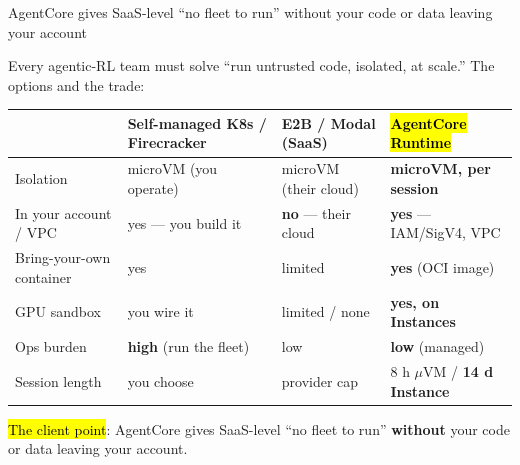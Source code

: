 \begin{frame}{AgentCore gives SaaS-level ``no fleet to run'' without your code or data leaving your account}
{\footnotesize Every agentic-RL team must solve ``run untrusted code, isolated, at scale.'' The options and the trade:\par}
\vspace{2mm}
\footnotesize
\begin{tabularx}{\textwidth}{@{}l Y Y Y@{}}
\toprule
 & \textbf{Self-managed K8s / Firecracker} & \textbf{E2B / Modal (SaaS)} & \hl{AgentCore Runtime}\\
\midrule
Isolation & microVM (you operate) & microVM (their cloud) & \textbf{microVM, per session}\\
In your account / VPC & yes --- you build it & \textbf{no} --- their cloud & \textbf{yes} --- IAM/SigV4, VPC\\
Bring-your-own container & yes & limited & \textbf{yes} (OCI image)\\
GPU sandbox & you wire it & limited / none & \textbf{yes, on Instances}\\
Ops burden & \textbf{high} (run the fleet) & low & \textbf{low} (managed)\\
Session length & you choose & provider cap & 8 h $\mu$VM / \textbf{14 d Instance}\\
\bottomrule
\end{tabularx}
\par\vspace{4mm}

{\small\raggedright\hl{The client point}: AgentCore gives SaaS-level ``no fleet to run'' \textbf{without} your code or data leaving your account.\par}
\end{frame}

